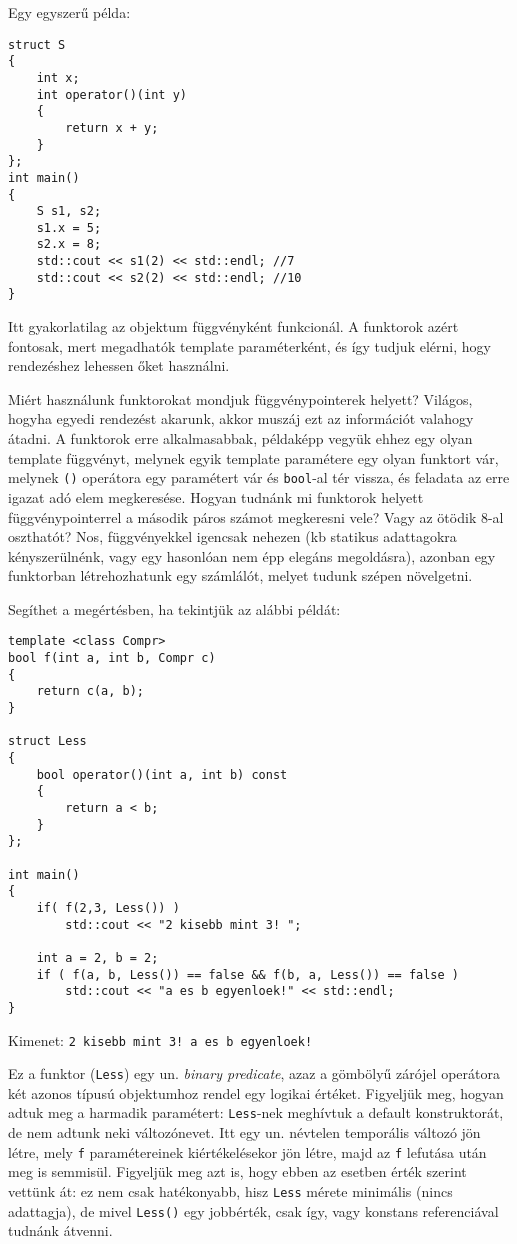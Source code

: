 \documentclass[a4paper,11.5pt]{article}
\begin{document}
	\smallskip
	Egy egyszerű példa:
	\begin{lstlisting}
struct S
{
	int x;
	int operator()(int y)
	{
		return x + y;
	}
};
int main()
{
	S s1, s2;
	s1.x = 5;
	s2.x = 8;
	std::cout << s1(2) << std::endl; //7
	std::cout << s2(2) << std::endl; //10
}
	\end{lstlisting}
	Itt gyakorlatilag az objektum függvényként funkcionál. A funktorok azért fontosak, mert megadhatók template paraméterként, és így tudjuk elérni, hogy rendezéshez lehessen őket használni.
	\begin{note}
	Miért használunk funktorokat mondjuk függvénypointerek helyett? Világos, hogyha egyedi rendezést akarunk, akkor muszáj ezt az információt valahogy átadni. A funktorok erre alkalmasabbak, példaképp vegyük ehhez egy olyan template függvényt, melynek egyik template paramétere egy olyan funktort vár, melynek \texttt{()} operátora egy paramétert vár és \texttt{bool}-al tér vissza, és feladata az erre igazat adó elem megkeresése. Hogyan tudnánk mi funktorok helyett függvénypointerrel a második páros számot megkeresni vele? Vagy az ötödik 8-al oszthatót? Nos, függvényekkel igencsak nehezen (kb statikus adattagokra kényszerülnénk, vagy egy hasonlóan nem épp elegáns megoldásra), azonban egy funktorban létrehozhatunk egy számlálót, melyet tudunk szépen növelgetni.
	\end{note}
	
	Segíthet a megértésben, ha tekintjük az alábbi példát:
	\begin{lstlisting}
template <class Compr>
bool f(int a, int b, Compr c)
{
	return c(a, b);
}

struct Less
{
	bool operator()(int a, int b) const
	{
		return a < b;
	}
};

int main()
{
	if( f(2,3, Less()) )
		std::cout << "2 kisebb mint 3! ";
	
	int a = 2, b = 2;
	if ( f(a, b, Less()) == false && f(b, a, Less()) == false )
		std::cout << "a es b egyenloek!" << std::endl;
}
	\end{lstlisting}
	Kimenet: \texttt{2 kisebb mint 3! a es b egyenloek!}
	
	Ez a funktor (\texttt{Less}) egy un. \textit{binary predicate}, azaz a gömbölyű zárójel operátora két azonos típusú objektumhoz rendel egy logikai értéket. Figyeljük meg, hogyan adtuk meg a harmadik paramétert: \texttt{Less}-nek meghívtuk a default konstruktorát, de nem adtunk neki változónevet. Itt egy un. névtelen temporális változó jön létre, mely \texttt{f} paramétereinek kiértékelésekor jön létre, majd az \texttt{f} lefutása után meg is semmisül. Figyeljük meg azt is, hogy ebben az esetben érték szerint vettünk át: ez nem csak hatékonyabb, hisz \texttt{Less} mérete minimális (nincs adattagja), de mivel \texttt{Less()} egy jobbérték, csak így, vagy konstans referenciával tudnánk átvenni.
	\smallskip
	
\end{document}
